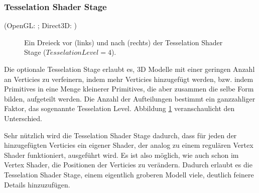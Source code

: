 \subsubsection{Tesselation Shader Stage}
(OpenGL: \cite{stage_gl_tesselation}; Direct3D: \cite{stage_d3d_tesselation})
\begin{figure}
    \newcommand{\drawtri}[3]
    {
        \draw (#1 + 0.0, #2 + 0.0) -- (#1 + #3 / 2, #2 + #3) -- (#1 + #3, #2) -- cycle;

        \fill (#1 + 0.0, #2 + 0.0) circle (1pt);
        \fill (#1 + #3 / 2, #2 + #3) circle (1pt);
        \fill (#1 + #3, #2) circle (1pt);
    }

    \caption{Ein Dreieck vor (links) und nach (rechts) der Tesselation Shader Stage ($Tesselation Level=4$).}
    \label{fig:tesselation}
    \begin{center}
    \end{center}
\end{figure}

Die optionale Tesselation Stage erlaubt es, 3D Modelle mit einer geringen Anzahl an Verticies zu verfeinern, indem mehr Verticies hinzugefügt werden, bzw. indem Primitives in eine Menge kleinerer Primitives, die aber zusammen die selbe Form bilden, aufgeteilt werden. Die Anzahl der Aufteilungen bestimmt ein ganzzahliger Faktor, das sogenannte Tesselation Level. Abbildung \ref{fig:tesselation} veranschaulicht den Unterschied. 

Sehr nützlich wird die Tesselation Shader Stage dadurch, dass für jeden der hinzugefügten Verticies ein eigener Shader, der analog zu einem regulären Vertex Shader funktioniert, ausgeführt wird. Es ist also möglich, wie auch schon im Vertex Shader, die Positionen der Verticies zu verändern. Dadurch erlaubt es die Tesselation Shader Stage, einem eigentlich groberen Modell viele, deutlich feinere Details hinzuzufügen. 

